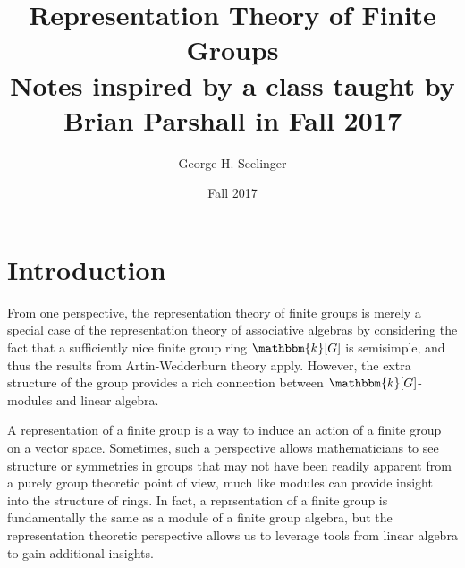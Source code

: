 \documentclass[11pt,leqno,oneside]{amsbook}
\title[Representation Theory of Finite Groups]{Representation Theory
  of Finite Groups \\ Notes
  inspired by a class taught by Brian Parshall in Fall 2017}
\author{George H. Seelinger}
\date{Fall 2017}
\newcommand{\bbk}{\mathbbm{k}}
\numberwithin{thm}{section}
\begin{document}
\maketitle
\section{Introduction}
From one perspective, the representation theory of finite groups is merely a
special case of the representation theory of associative algebras by
considering the fact that a sufficiently nice finite group ring \(\bbk[G]\)
is semisimple, and thus the results from Artin-Wedderburn
theory apply. However, the extra structure of the group provides a
rich connection between \(\bbk[G]\)-modules and linear algebra.


A representation of a finite group is a way to induce an action of a
finite group on a vector space. Sometimes, such a perspective allows
mathematicians to see structure or symmetries in groups that may not
have been readily apparent from a purely group theoretic point of
view, much like modules can provide insight into the structure of
rings. In fact, a reprsentation of a finite group is fundamentally the
same as a module of a finite group algebra, but the representation
theoretic perspective allows us to leverage tools from linear algebra
to gain additional insights.
\end{document}
